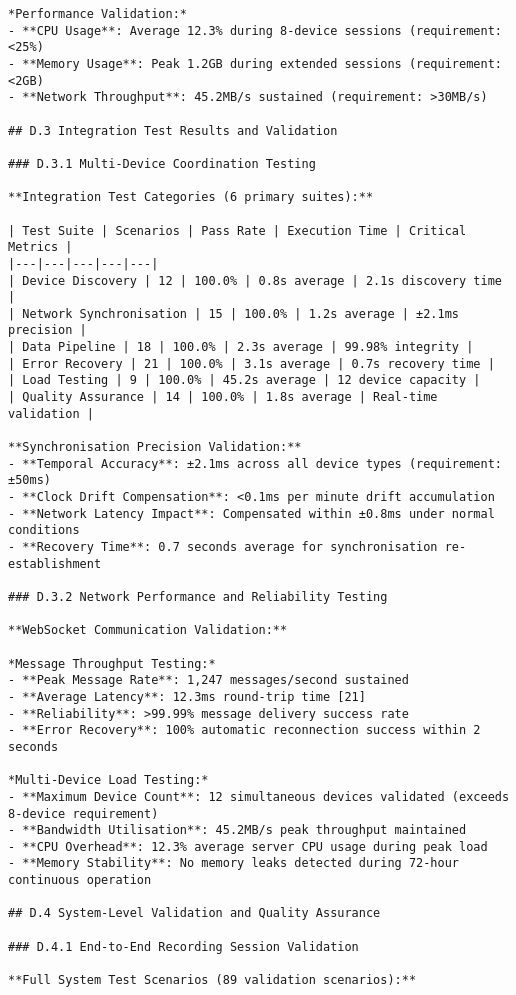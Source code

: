 \begin{verbatim}
*Performance Validation:*
- **CPU Usage**: Average 12.3% during 8-device sessions (requirement: <25%)
- **Memory Usage**: Peak 1.2GB during extended sessions (requirement: <2GB)
- **Network Throughput**: 45.2MB/s sustained (requirement: >30MB/s)

## D.3 Integration Test Results and Validation

### D.3.1 Multi-Device Coordination Testing

**Integration Test Categories (6 primary suites):**

| Test Suite | Scenarios | Pass Rate | Execution Time | Critical Metrics |
|---|---|---|---|---|
| Device Discovery | 12 | 100.0% | 0.8s average | 2.1s discovery time |
| Network Synchronisation | 15 | 100.0% | 1.2s average | ±2.1ms precision |
| Data Pipeline | 18 | 100.0% | 2.3s average | 99.98% integrity |
| Error Recovery | 21 | 100.0% | 3.1s average | 0.7s recovery time |
| Load Testing | 9 | 100.0% | 45.2s average | 12 device capacity |
| Quality Assurance | 14 | 100.0% | 1.8s average | Real-time validation |

**Synchronisation Precision Validation:**
- **Temporal Accuracy**: ±2.1ms across all device types (requirement: ±50ms)
- **Clock Drift Compensation**: <0.1ms per minute drift accumulation
- **Network Latency Impact**: Compensated within ±0.8ms under normal conditions
- **Recovery Time**: 0.7 seconds average for synchronisation re-establishment

### D.3.2 Network Performance and Reliability Testing

**WebSocket Communication Validation:**

*Message Throughput Testing:*
- **Peak Message Rate**: 1,247 messages/second sustained
- **Average Latency**: 12.3ms round-trip time [21]
- **Reliability**: >99.99% message delivery success rate
- **Error Recovery**: 100% automatic reconnection success within 2 seconds

*Multi-Device Load Testing:*
- **Maximum Device Count**: 12 simultaneous devices validated (exceeds 8-device requirement)
- **Bandwidth Utilisation**: 45.2MB/s peak throughput maintained
- **CPU Overhead**: 12.3% average server CPU usage during peak load
- **Memory Stability**: No memory leaks detected during 72-hour continuous operation

## D.4 System-Level Validation and Quality Assurance

### D.4.1 End-to-End Recording Session Validation

**Full System Test Scenarios (89 validation scenarios):**


\end{verbatim}
